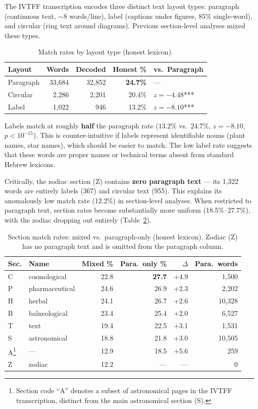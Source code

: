 \documentclass[11pt,a4paper]{article}
\begin{document}
The IVTFF transcription encodes three distinct text layout types: paragraph
(continuous text, $\sim$8 words/line), label (captions under figures, 85\%
single-word), and circular (ring text around diagrams). Previous section-level
analyses mixed these types.

\begin{table}[htbp]
\centering
\caption{Match rates by layout type (honest lexicon).}
\label{tab:layout}
\small
\begin{tabular}{@{}lrrrl@{}}
\toprule
Layout & Words & Decoded & Honest \% & vs.\ Paragraph \\
\midrule
Paragraph & 33,684 & 32,852 & \textbf{24.7\%} & --- \\
Circular & 2,286 & 2,201 & 20.4\% & $z=-4.48$*** \\
Label & 1,022 & 946 & 13.2\% & $z=-8.10$*** \\
\bottomrule
\end{tabular}
\end{table}

Labels match at roughly \textbf{half} the paragraph rate ($13.2\%$ vs.\
$24.7\%$, $z=-8.10$, $p<10^{-15}$). This is counter-intuitive if labels
represent identifiable nouns (plant names, star names), which should be
easier to match. The low label rate suggests that these words are proper names
or technical terms absent from standard Hebrew lexicons.

Critically, the zodiac section (Z) contains \textbf{zero paragraph text}
--- its 1,322 words are entirely labels (367) and circular text (955). This
explains its anomalously low match rate (12.2\%) in section-level analyses.
When restricted to paragraph text, section rates become substantially more
uniform (18.5\%--27.7\%), with the zodiac dropping out entirely
(Table~\ref{tab:parasection}).

\begin{table}[htbp]
\centering
\caption{Section match rates: mixed vs.\ paragraph-only (honest lexicon).
Zodiac (Z) has no paragraph text and is omitted from the paragraph column.}
\label{tab:parasection}
\small
\begin{tabular}{@{}llrrrr@{}}
\toprule
Sec. & Name & Mixed \% & Para.\ only \% & $\Delta$ & Para.\ words \\
\midrule
C & cosmological & 22.8 & \textbf{27.7} & +4.9 & 1,500 \\
P & pharmaceutical & 24.6 & 26.9 & +2.3 & 2,202 \\
H & herbal & 24.1 & 26.7 & +2.6 & 10,328 \\
B & balneological & 23.4 & 25.4 & +2.0 & 6,527 \\
T & text & 19.4 & 22.5 & +3.1 & 1,531 \\
S & astronomical & 18.8 & 21.8 & +3.0 & 10,505 \\
A\footnote{Section code ``A'' denotes a subset of astronomical pages in the IVTFF transcription, distinct from the main astronomical section (S).} & --- & 12.9 & 18.5 & +5.6 & 259 \\
Z & zodiac & 12.2 & --- & --- & 0 \\
\bottomrule
\end{tabular}
\end{table}
\end{document}
